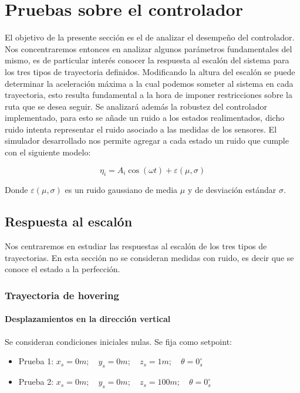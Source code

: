 \documentclass[main]{subfiles}
\begin{document}
\chapter{Pruebas sobre el controlador}
\label{chap:test_control}

El objetivo de la presente secci\'on es el de analizar el desempeño del controlador. Nos concentraremos entonces en analizar algunos par\'ametros fundamentales del mismo, es de particular inter\'es conocer la respuesta al escal\'on del sistema para los tres tipos de trayectoria definidos. Modificando la altura del escal\'on se puede determinar la aceleraci\'on m\'axima a la cual podemos someter al sistema en cada trayectoria, esto resulta fundamental a la hora de imponer restricciones sobre la ruta que se desea seguir. Se analizar\'a adem\'as la robustez del controlador implementado, para esto se añade un ruido a los estados realimentados, dicho ruido intenta representar el ruido asociado a las medidas de los sensores. El simulador desarrollado nos permite agregar a cada estado un ruido que cumple con el siguiente modelo:

\begin{equation}
\label{noise}
\eta_i = A_i\cos(\omega t)+\varepsilon(\mu,\sigma)
\end{equation}

Donde $\varepsilon(\mu,\sigma)$ es un ruido gaussiano de media $\mu$ y de desviaci\'on est\'andar $\sigma$.

\section{Respuesta al escal\'on}
Nos centraremos en estudiar las respuestas al escal\'on de los tres tipos de trayectorias. En esta secci\'on no se consideran medidas con ruido, es decir que se conoce el estado a la perfecci\'on.  

\subsection{Trayectoria de hovering}

\subsubsection{Desplazamientos en la direcci\'on vertical}
Se consideran condiciones iniciales nulas. Se fija como setpoint:
\begin{itemize}
\item Prueba 1: ${x_s = 0 m;\quad y_s = 0 m;\quad z_s = 1 m;\quad \theta = 0_s^\circ}$
\item Prueba 2: ${x_s = 0 m;\quad y_s = 0 m;\quad z_s = 100 m;\quad \theta = 0_s^\circ}$
\end{itemize}
\end{document}
